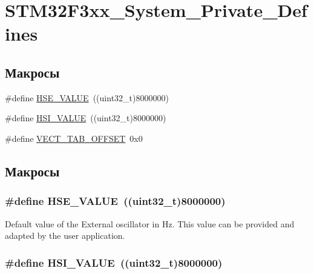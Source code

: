 \hypertarget{group___s_t_m32_f3xx___system___private___defines}{
\section{STM32F3xx\_\-System\_\-Private\_\-Defines}
\label{group___s_t_m32_f3xx___system___private___defines}
}
\subsection*{Макросы}
\begin{CompactItemize}
\item 
\#define \hyperlink{group___s_t_m32_f3xx___system___private___defines_geafcff4f57440c60e64812dddd13e7cb}{HSE\_\-VALUE}~((uint32\_\-t)8000000)
\item 
\#define \hyperlink{group___s_t_m32_f3xx___system___private___defines_gaa8c76e274d0f6dd2cefb5d0b17fbc37}{HSI\_\-VALUE}~((uint32\_\-t)8000000)
\item 
\#define \hyperlink{group___s_t_m32_f3xx___system___private___defines_g40e1495541cbb4acbe3f1819bd87a9fe}{VECT\_\-TAB\_\-OFFSET}~0x0
\end{CompactItemize}


\subsection{Макросы}
\hypertarget{group___s_t_m32_f3xx___system___private___defines_geafcff4f57440c60e64812dddd13e7cb}{
\subsubsection[{HSE\_\-VALUE}]{\setlength{\rightskip}{0pt plus 5cm}\#define HSE\_\-VALUE~((uint32\_\-t)8000000)}}
\label{group___s_t_m32_f3xx___system___private___defines_geafcff4f57440c60e64812dddd13e7cb}


Default value of the External oscillator in Hz. This value can be provided and adapted by the user application. \hypertarget{group___s_t_m32_f3xx___system___private___defines_gaa8c76e274d0f6dd2cefb5d0b17fbc37}{
\subsubsection[{HSI\_\-VALUE}]{\setlength{\rightskip}{0pt plus 5cm}\#define HSI\_\-VALUE~((uint32\_\-t)8000000)}}
\label{group___s_t_m32_f3xx___system___private___defines_gaa8c76e274d0f6dd2cefb5d0b17fbc37}


